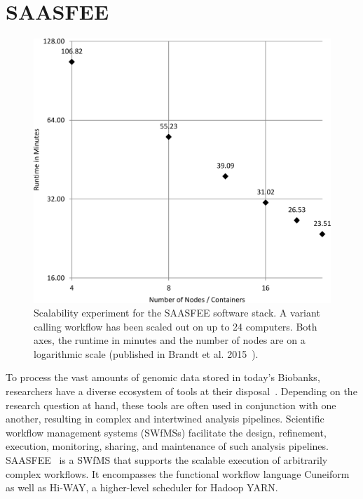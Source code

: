 \section{SAASFEE}


\begin{figure}
  \centering
  \includegraphics[width=.7\textwidth]{imgs/wf_runtime.png}
  \caption{Scalability experiment for the SAASFEE software stack. A variant calling workflow has been scaled out on up to 24 computers. Both axes, the runtime in minutes and the number of nodes are on a logarithmic scale (published in Brandt et al. 2015~\cite{Brandt2015}).}
  \label{fig:saasfee_scaling}
\end{figure}

To process the vast amounts of genomic data stored in today's Biobanks, researchers have a diverse ecosystem of tools at their disposal~\cite{Pabinger2014}. Depending on the research question at hand, these tools are often used in conjunction with one another, resulting in complex and intertwined analysis pipelines. Scientific workflow management systems (SWfMSs) facilitate the design, refinement, execution, monitoring, sharing, and maintenance of such analysis pipelines. SAASFEE~\cite{vldb_demo} is a SWfMS that supports the scalable execution of arbitrarily complex workflows. It encompasses the functional workflow language Cuneiform as well as Hi-WAY, a higher-level scheduler for Hadoop YARN.

